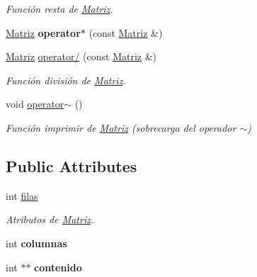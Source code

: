 \begin{DoxyCompactItemize}
\begin{DoxyCompactList}\small\item\em Función resta de \hyperlink{class_matriz}{Matriz}. \end{DoxyCompactList}\item 
\hypertarget{class_matriz_a32f350fb2091ff6ee3ad7ca9135a7e4e}{\hyperlink{class_matriz}{Matriz} {\bfseries operator$\ast$} (const \hyperlink{class_matriz}{Matriz} \&)}\label{class_matriz_a32f350fb2091ff6ee3ad7ca9135a7e4e}

\item 
\hypertarget{class_matriz_a3757454cd8555a964805200b87ccff6f}{\hyperlink{class_matriz}{Matriz} \hyperlink{class_matriz_a3757454cd8555a964805200b87ccff6f}{operator/} (const \hyperlink{class_matriz}{Matriz} \&)}\label{class_matriz_a3757454cd8555a964805200b87ccff6f}

\begin{DoxyCompactList}\small\item\em Función división de \hyperlink{class_matriz}{Matriz}. \end{DoxyCompactList}\item 
\hypertarget{class_matriz_a7eb9064958c359ce2f6b6ab0327b1282}{void \hyperlink{class_matriz_a7eb9064958c359ce2f6b6ab0327b1282}{operator$\sim$} ()}\label{class_matriz_a7eb9064958c359ce2f6b6ab0327b1282}

\begin{DoxyCompactList}\small\item\em Función imprimir de \hyperlink{class_matriz}{Matriz} (sobrecarga del operador $\sim$) \end{DoxyCompactList}\end{DoxyCompactItemize}
\subsection*{Public Attributes}
\begin{DoxyCompactItemize}
\item 
\hypertarget{class_matriz_a0696de23c471bd7b02c3724aa007276d}{int \hyperlink{class_matriz_a0696de23c471bd7b02c3724aa007276d}{filas}}\label{class_matriz_a0696de23c471bd7b02c3724aa007276d}

\begin{DoxyCompactList}\small\item\em Atributos de \hyperlink{class_matriz}{Matriz}. \end{DoxyCompactList}\item 
\hypertarget{class_matriz_a7c034f5eb81585a62ac1331c2127ac19}{int {\bfseries columnas}}\label{class_matriz_a7c034f5eb81585a62ac1331c2127ac19}

\item 
\hypertarget{class_matriz_a5cc3d2e7d7b29fab5c395ad022446a7e}{int $\ast$$\ast$ {\bfseries contenido}}\label{class_matriz_a5cc3d2e7d7b29fab5c395ad022446a7e}

\end{DoxyCompactItemize}


